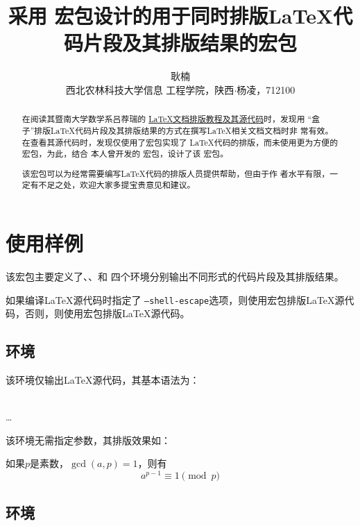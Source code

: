 \documentclass{ctexart}
\title{\Large \heiti 采用 \pkg{tcolorbox} 宏包设计的用于同时排版\LaTeX 代码片段及其排版结果的宏包 \pkg{texboxie.sty}}
\author{\zihao{4} \fangsong 耿楠\\\small \songti 西北农林科技大学信息
  工程学院，陕西$\cdot$杨凌，712100}
\newcommand{\qtmark}[1]{“#1”}
\begin{document}

\maketitle

\begin{abstract}
  在阅读其暨南大学数学系吕荐瑞的 \href{https://lvjr.bitbucket.io/latex.html?2018}{\LaTeX 文档排版教程及其源代码}时，发现用
  \qtmark{盒子}排版\LaTeX 代码片段及其排版结果的方式在撰写\LaTeX 相关文档文档时非
  常有效。在查看其源代码时，发现仅使用了宏包实现了
  \LaTeX 代码的排版，而未使用更为方便的宏包，为此，结合
  本人曾开发的 \href{https://github.com/registor/boxiesty}{} 宏包，设计了该 \href{https://github.com/registor/texboxies}{} 宏包。

  该宏包可以为经常需要编写\LaTeX 代码的排版人员提供帮助，但由于作
  者水平有限，一定有不足之处，欢迎大家多提宝贵意见和建议。
\end{abstract}

\section{使用样例}

该宏包主要定义了、、和
四个环境分别输出不同形式的代码片段及其排版结果。

如果编译\LaTeX 源代码时指定了
\texttt{--shell-escape}选项，则使用宏包排版\LaTeX 源代
码，否则，则使用宏包排版\LaTeX 源代码。

\subsection{环境}

该环境仅输出\LaTeX 源代码，其基本语法为：

\begin{command}
 \\
\ldots \\
\end{command}

该环境无需指定参数，其排版效果如：

\begin{codeonly}
如果$p$是素数，$\gcd(a,p)=1$，则有
$$a^{p-1} \equiv 1 \pmod{p}$$
\end{codeonly}

\subsection{环境}
\end{document}
